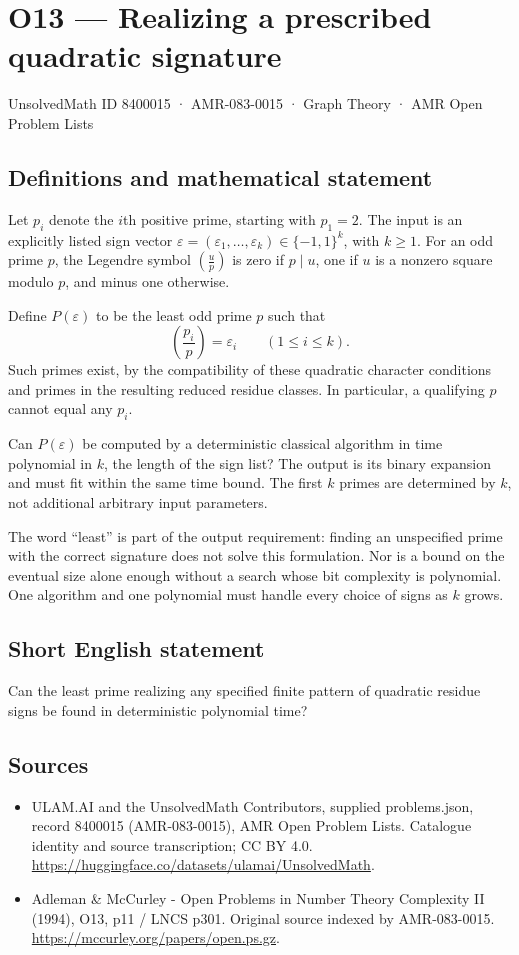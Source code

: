 \documentclass[11pt,a4paper]{article}
\begin{document}
\section*{O13 — Realizing a prescribed quadratic signature}\label{8400015}
{\small UnsolvedMath ID 8400015 · AMR-083-0015 · Graph Theory · AMR Open Problem Lists}
\subsection{Definitions and mathematical statement}
Let $p_i$ denote the $i$th positive prime, starting with $p_1=2$. The input is an explicitly listed sign vector $\varepsilon=(\varepsilon_1,\ldots,\varepsilon_k)\in\{-1,1\}^k$, with $k\ge1$. For an odd prime $p$, the Legendre symbol $\left(\frac up\right)$ is zero if $p\mid u$, one if $u$ is a nonzero square modulo $p$, and minus one otherwise.

Define $P(\varepsilon)$ to be the least odd prime $p$ such that
\[
\left(\frac{p_i}{p}\right)=\varepsilon_i\qquad(1\le i\le k).
\]
Such primes exist, by the compatibility of these quadratic character conditions and primes in the resulting reduced residue classes. In particular, a qualifying $p$ cannot equal any $p_i$.

Can $P(\varepsilon)$ be computed by a deterministic classical algorithm in time polynomial in $k$, the length of the sign list? The output is its binary expansion and must fit within the same time bound. The first $k$ primes are determined by $k$, not additional arbitrary input parameters.

The word ``least'' is part of the output requirement: finding an unspecified prime with the correct signature does not solve this formulation. Nor is a bound on the eventual size alone enough without a search whose bit complexity is polynomial. One algorithm and one polynomial must handle every choice of signs as $k$ grows.
\subsection{Short English statement}
Can the least prime realizing any specified finite pattern of quadratic residue signs be found in deterministic polynomial time?
\subsection{Sources}
\begin{itemize}
\item[S1] ULAM.AI and the UnsolvedMath Contributors, supplied problems.json, record 8400015 (AMR-083-0015), AMR Open Problem Lists. Catalogue identity and source transcription; CC BY 4.0.
\url{https://huggingface.co/datasets/ulamai/UnsolvedMath}.
\item[S2] Adleman \& McCurley - Open Problems in Number Theory Complexity II (1994), O13, p11 / LNCS p301. Original source indexed by AMR-083-0015.
\url{https://mccurley.org/papers/open.ps.gz}.
\end{itemize}
\end{document}
